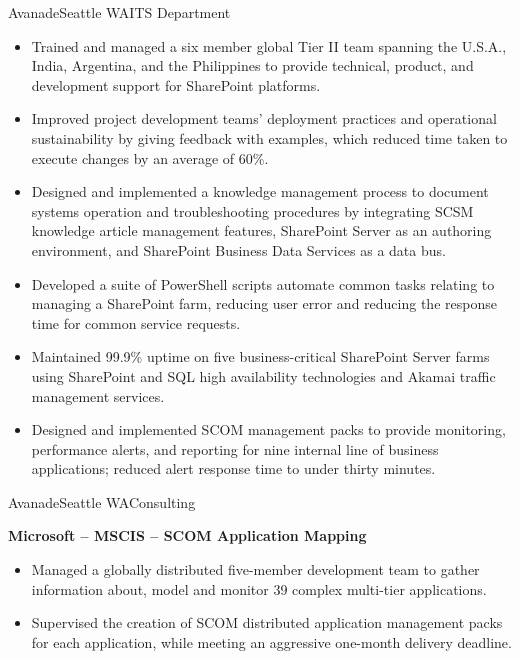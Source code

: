 \documentclass[11pt,letter,roman]{moderncv}
\begin{document}
{Avanade}{Seattle WA}{ITS Department}{%
  \begin{itemize}
    \item Trained and managed a six member global Tier II team spanning the
      U.S.A., India, Argentina, and the Philippines to provide technical,
      product, and development support for SharePoint platforms.
    \item Improved project development teams' deployment practices and
      operational sustainability by giving feedback with examples, which
      reduced time taken to execute changes by an average of 60\%.
    \item Designed and implemented a knowledge management process to document
      systems operation and troubleshooting procedures by integrating SCSM
      knowledge article management features, SharePoint Server as an authoring
      environment, and SharePoint Business Data Services as a data bus.
    \item Developed a suite of PowerShell scripts automate common tasks
      relating to managing a SharePoint farm, reducing user error and reducing
      the response time for common service requests.
    \item Maintained 99.9\% uptime on five business-critical SharePoint
      Server farms using SharePoint and SQL high availability technologies and
      Akamai traffic management services.
    \item Designed and implemented SCOM management packs to provide
      monitoring, performance alerts, and reporting for nine internal line of
      business applications; reduced alert response time to
      under thirty minutes.
  \end{itemize}
}
{Avanade}{Seattle WA}{Consulting}{%
  \textbf{Microsoft -- MSCIS -- SCOM Application Mapping}
  \begin{itemize}
    \item Managed a globally distributed five-member development team to
      gather information about, model and monitor 39 complex multi-tier
      applications.
    \item Supervised the creation of SCOM distributed application management
      packs for each application, while meeting an aggressive
      one-month delivery deadline.
  \end{itemize}
}
\end{document}
